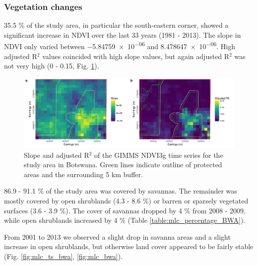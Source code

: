 \documentclass[12pt,a4paper, twoside, english]{article}
\begin{document}
\subsubsection{Vegetation changes}


35.5 \% of the study area, in particular the south-eastern corner, showed a significant increase in NDVI over the last 33 years (1981 - 2013). The slope in NDVI only varied between \num{-5.84759e-06} and \num{8.478647e-06}. High adjusted R$^{2}$ values coincided with high slope values, but again adjusted R$^{2}$ was not very high (0 - 0.15, Fig. \ref{fig:gimms_bwa}).

\begin{figure}[H]
  \centering
  \includegraphics[width=\textwidth]{figures/Gimms_NDVI_BWA.png}
  \caption[Protection trend Ngamiland]{Slope and adjusted R$^{2}$ of the GIMMS NDVI3g time series for the study area in Botswana. Green lines indicate outline of protected areas and the surrounding 5 km buffer.}
  \label{fig:gimms_bwa}
\end{figure}

86.9 - 91.1 \% of the study area was covered by savannas. The remainder was mostly covered by open shrublands (4.3 - 8.6 \%) or barren or sparsely vegetated surfaces (3.6 - 3.9 \%). The cover of savannas dropped by 4 \% from 2008 - 2009, while open shrublands increased by 4 \% (Table \ref{table:mlc_percentage_BWA}).

From 2001 to 2013 we observed a slight drop in savanna areas and a slight increase in open shrublands, but otherwise land cover appeared to be fairly stable (Fig. \ref{fig:mlc_ts_bwa}, \ref{fig:mlc_bwa}).
\end{document}
